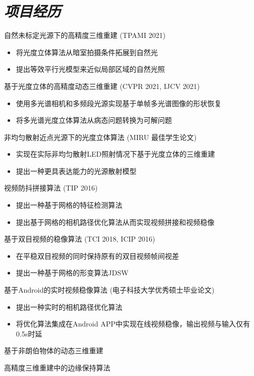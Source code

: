\documentclass[UTF8]{ctexart}
\begin{document}
	\section{\textit{\textbf{项目经历}}}
	\begin{enumerate}[label={[\arabic*]}]
	\item 自然未标定光源下的高精度三维重建 (TPAMI 2021)
	\begin{itemize}
		\item 将光度立体算法从暗室拍摄条件拓展到自然光
		\item 提出等效平行光模型来近似局部区域的自然光照
	\end{itemize}
	\item 基于光度立体的高精度动态三维重建 (CVPR 2021, IJCV 2021)
	\begin{itemize}
		\item 使用多光谱相机和多频段光源实现基于单帧多光谱图像的形状恢复
		\item 将多光谱光度立体算法从病态问题转换为可解问题
	\end{itemize}
	\item 非均匀散射近点光源下的光度立体算法 (MIRU 最佳学生论文)
	\begin{itemize}
		\item 实现在实际非均匀散射LED照射情况下基于光度立体的三维重建
		\item 提出一种更具表达能力的光源散射模型
	\end{itemize}
	\item 视频防抖拼接算法 (TIP 2016)
	\begin{itemize}
		\item 提出一种基于网格的特征检测算法
		\item 提出基于网格的相机路径优化算法从而实现视频拼接和视频稳像
	\end{itemize}
	\item 基于双目视频的稳像算法 (TCI 2018, ICIP 2016)
	\begin{itemize}
		\item 在平稳双目视频的同时保持原有的双目视频帧间视差
		\item 提出一种基于网格的形变算法JDSW
	\end{itemize}
	\item 基于Android的实时视频稳像算法 (电子科技大学优秀硕士毕业论文)
	\begin{itemize}
		\item 提出一种实时的相机路径优化算法
		\item 将优化算法集成在Android APP中实现在线视频稳像，输出视频与输入仅有0.5s时延
	\end{itemize}
	\item 基于非朗伯物体的动态三维重建
	\item 高精度三维重建中的边缘保持算法
	\end{enumerate}
	
\end{document}
